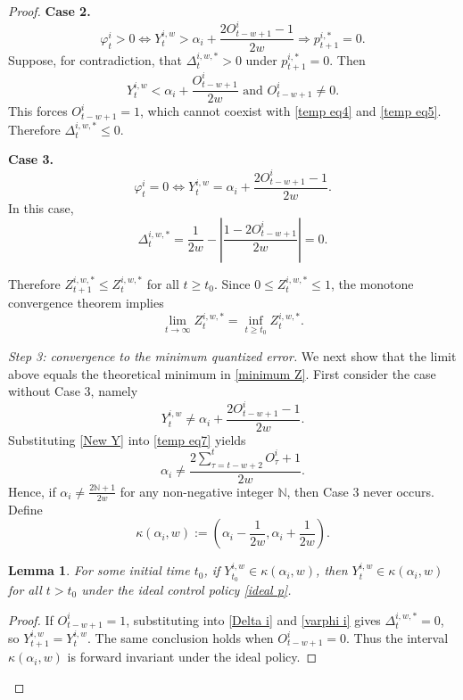 \documentclass[a4paper,fleqn]{cas-dc}
\theoremstyle{plain}
\newtheorem{lemma}{Lemma}
\theoremstyle{remark}
\theoremstyle{plain}
\begin{document}
\begin{proof}
\textbf{Case 2.}
\begin{equation}\label{temp eq4}
    \varphi_t^i > 0 \Leftrightarrow Y_{t}^{i,w} > \alpha_i + \dfrac{2O^{i}_{t-w+1}-1}{2w}
    \Rightarrow p_{t+1}^{i,*} = 0.
\end{equation}
Suppose, for contradiction, that $\Delta_t^{i,w,*} > 0$ under $p_{t+1}^{i,*} = 0$. Then
\begin{equation}\label{temp eq5}
    Y_t^{i,w} < \alpha_i + \frac{O_{t-w+1}^i}{2w} \text{ and } O_{t-w+1}^i \neq 0.
\end{equation}
This forces $O_{t-w+1}^i = 1$, which cannot coexist with \eqref{temp eq4} and \eqref{temp eq5}. Therefore $\Delta_t^{i,w,*} \leq 0$.

\textbf{Case 3.}
\begin{equation*}
    \varphi_t^i = 0 \Leftrightarrow Y_{t}^{i,w} = \alpha_i + \dfrac{2O^{i}_{t-w+1}-1}{2w}.
\end{equation*}
In this case,
\[
\Delta_t^{i,w,*} = \frac{1}{2w} - \left|\frac{1-2O_{t-w+1}^i}{2w}\right| = 0.
\]

Therefore $Z_{t+1}^{i,w,*}\le Z_t^{i,w,*}$ for all $t\ge t_0$. Since $0\le Z_t^{i,w,*}\le 1$, the monotone convergence theorem implies
\begin{equation*}
    \lim_{t \to \infty} Z_t^{i,w,*} = \inf_{t \ge t_0} Z_t^{i,w,*}.
\end{equation*}

\textit{Step 3: convergence to the minimum quantized error.} We next show that the limit above equals the theoretical minimum in \eqref{minimum Z}. First consider the case without Case 3, namely
\begin{equation} \label{temp eq7}
    Y_{t}^{i,w} \neq \alpha_i + \dfrac{2O^{i}_{t-w+1}-1}{2w}.
\end{equation}
Substituting \eqref{New Y} into \eqref{temp eq7} yields
\[
\alpha_i \neq \frac{2\sum_{\tau = t-w+2}^{t}O_{\tau}^i+1}{2w}.
\]
Hence, if $\alpha_i \neq \frac{2\mathbb{N}+1}{2w}$ for any non-negative integer $\mathbb{N}$, then Case 3 never occurs. Define
\begin{equation*}
    \kappa(\alpha_i,w):=\left(\alpha_i - \frac{1}{2w},\alpha_i + \frac{1}{2w}\right).
\end{equation*}

\begin{lemma}
For some initial time $t_0$, if $Y_{t_0}^{i,w} \in \kappa(\alpha_i,w)$, then $Y_t^{i,w} \in \kappa(\alpha_i,w)$ for all $t > t_0$ under the ideal control policy \eqref{ideal p}.
\end{lemma}
\begin{proof}
If $O_{t-w+1}^{i} = 1$, substituting into \eqref{Delta i} and \eqref{varphi i} gives $\Delta_{t}^{i,w,*} = 0$, so $Y_{t+1}^{i,w} = Y_{t}^{i,w}$. The same conclusion holds when $O_{t-w+1}^{i} = 0$. Thus the interval $\kappa(\alpha_i,w)$ is forward invariant under the ideal policy.
\end{proof}


\end{proof}
\end{document}
